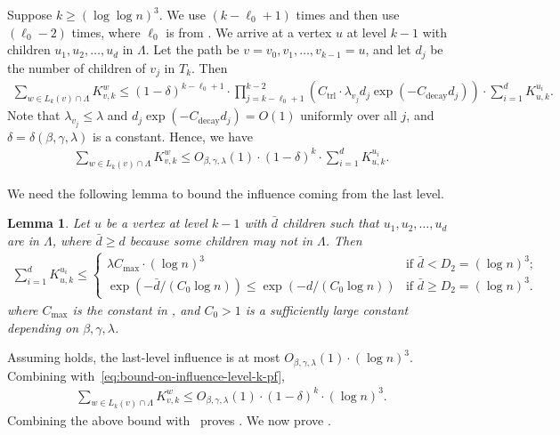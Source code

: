 \documentclass[11pt]{amsart}
\newcommand{\tp}[1]{{\left( #1 \right)}}
\newtheorem{lemma}[theorem]{Lemma}
\theoremstyle{definition}
\theoremstyle{remark}
\begin{document}
Suppose $k \geq (\log \log n)^3$. We use  $(k - \ell_0 + 1)$ times and then use  $(\ell_0 - 2)$ times,
where $\ell_0$ is from . We arrive at a vertex $u$ at level $k-1$ with children $u_1,u_2,\ldots,u_d$ in $\Lambda$. Let the path be $v=v_0,v_1,\ldots,v_{k-1}=u$, and let $d_j$ be the number of children of $v_j$ in $T_k$. Then
\begin{align*}
    \sum_{w \in L_k(v) \cap \Lambda } K_{v,k}^w \leq (1-\delta)^{k-\ell_0+1} \cdot \prod_{j=k-\ell_0+1}^{k-2} \tp{C_{\text{trl}} \cdot \lambda_{v_j} d_j \exp(-C_{\text{decay}}d_j)} \cdot \sum_{i=1}^d K_{u,k}^{u_i}.
\end{align*} 
Note that $\lambda_{v_j}\leq \lambda$ and $d_j \exp(-C_{\text{decay}}d_j)=O(1)$ uniformly over all $j$, and $\delta = \delta(\beta,\gamma,\lambda)$ is a constant. Hence, we have
\begin{align}\label{eq:bound-on-influence-level-k-pf}
    \sum_{w \in L_k(v) \cap \Lambda} K_{v,k}^w \leq O_{\beta,\gamma,\lambda}(1) \cdot (1-\delta)^{k} \cdot \sum_{i=1}^d K_{u,k}^{u_i}.
\end{align}

We need the following lemma to bound the influence coming from the last level.
\begin{lemma}\label{lemma:bound-on-last-level-influence}
Let $u$ be a vertex at level $k-1$ with $\bar d$ children such that $u_1,u_2,\ldots,u_{d}$ are in $\Lambda$, where $\bar{d} \geq d$ because some children may not in $\Lambda$. Then
\begin{align*}
    \sum_{i=1}^{d} K_{u,k}^{u_i} \leq \begin{cases}
    \lambda C_{\max} \cdot (\log n)^3 & \text{if } \bar d < D_2 = (\log n)^3;\\
    \exp(-\bar d/(C_0 \log n)) \leq \exp(-d/(C_0 \log n)) & \text{if } \bar d \geq D_2 = (\log n)^3.
    \end{cases}
\end{align*}
where $C_{\max}$ is the constant in , 
and $C_0 > 1$ is a sufficiently large constant depending on $\beta,\gamma,\lambda$.
\end{lemma}

Assuming  holds, the last-level influence is at most $O_{\beta,\gamma,\lambda}(1) \cdot (\log n)^3$. Combining with~\eqref{eq:bound-on-influence-level-k-pf}, 
\begin{align*}
  \sum_{w \in L_k(v) \cap \Lambda} K_{v,k}^w \leq O_{\beta,\gamma,\lambda}(1) \cdot (1-\delta)^{k} \cdot (\log n)^3.
\end{align*}
Combining the above bound with~ proves .
We now prove .
\end{document}
